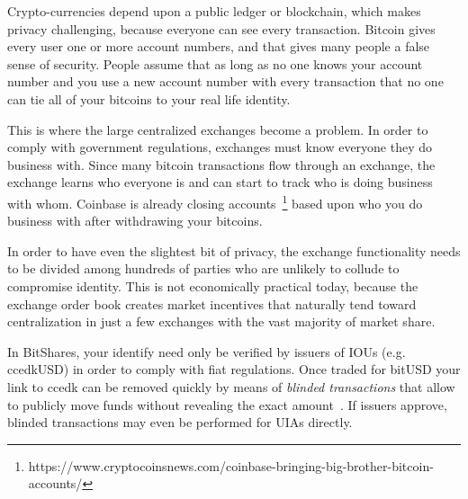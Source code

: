 Crypto-currencies depend upon a public ledger or blockchain, which makes
privacy challenging, because everyone can see every transaction. Bitcoin gives
every user one or more account numbers, and that gives many people a false
sense of security.  People assume that as long as no one knows your account
number and you use a new account number with every transaction that no one can
tie all of your bitcoins to your real life identity.

This is where the large centralized exchanges become a problem. In order to
comply with government regulations, exchanges must know everyone they do
business with. Since many bitcoin transactions flow through an exchange, the
exchange learns who everyone is and can start to track who is doing business
with whom. Coinbase is already closing
accounts~\footnote{https://www.cryptocoinsnews.com/coinbase-bringing-big-brother-bitcoin-accounts/}
based upon who you do business with after withdrawing your bitcoins.

In order to have even the slightest bit of privacy, the exchange functionality
needs to be divided among hundreds of parties who are unlikely to collude to
compromise identity. This is not economically practical today, because the
exchange order book creates market incentives that naturally tend toward
centralization in just a few exchanges with the vast majority of market share.

In BitShares, your identify need only be verified by issuers of IOUs (e.g.
ccedkUSD) in order to comply with fiat regulations. Once traded for bitUSD your
link to ccedk can be removed quickly by means of \emph{blinded transactions}
that allow to publicly move funds without revealing the exact
amount~\cite{bts:general,blindSigPaper}. If issuers approve, blinded
transactions may even be performed for UIAs directly.
